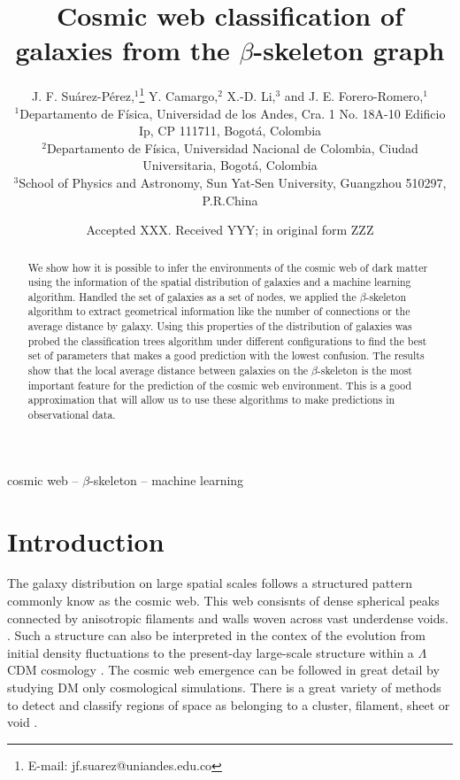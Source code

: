 \documentclass[usenatbib]{mnras}
\title[The $\beta$-skeleton and the T-web]{Cosmic web classification of galaxies from the $\beta$-skeleton graph}
\author[J. F. Su\'arez-P\'erez et al.]{
J. F. Su\'arez-P\'erez,$^{1}$\thanks{E-mail: jf.suarez@uniandes.edu.co}
Y. Camargo,$^{2}$ 
X.-D. Li,$^{3}$
and J. E. Forero-Romero,$^{1}$
\\
$^{1}$Departamento de F\'isica, Universidad de los Andes, Cra. 1 No. 18A-10 Edificio Ip, CP 111711, Bogot\'a, Colombia\\
$^{2}$Departamento de F\'isica, Universidad Nacional de Colombia, Ciudad Universitaria, Bogot\'a, Colombia\\
$^{3}$School of Physics and Astronomy, Sun Yat-Sen University, Guangzhou 510297, P.R.China\\
}
\date{Accepted XXX. Received YYY; in original form ZZZ}
\begin{document}
\label{firstpage}
\pagerange{\pageref{firstpage}--\pageref{lastpage}}
\maketitle

\begin{abstract}
We show how it is possible to infer the environments of the cosmic web
of dark matter using the information of the spatial distribution of
galaxies and a machine learning algorithm. 
Handled the set of galaxies
as a set of nodes, we applied the $\beta$-skeleton algorithm to
extract geometrical information like the number of connections or the
average distance by galaxy. 
Using this properties of the distribution
of galaxies was probed the classification trees algorithm under
different configurations to find the best set of parameters that makes
a good prediction with the lowest confusion. 
The results show that the
local average distance between galaxies on the $\beta$-skeleton is the
most important feature for the prediction of the cosmic web
environment. 
This is a good approximation that will allow us to use
these algorithms to make predictions in observational data. 
\end{abstract}

\begin{keywords}
cosmic web -- $\beta$-skeleton -- machine learning
\end{keywords}


\section{Introduction}

The galaxy distribution on large spatial scales follows a structured 
pattern commonly know as the cosmic web. 
This web consisnts of dense spherical peaks connected by
anisotropic filaments and walls woven across vast underdense voids. 
\citep{1996Bond}. 
Such a structure can also be interpreted in the contex of 
the evolution from initial density fluctuations to the present-day 
large-scale structure within a $\Lambda$CDM cosmology \citep{1987White}. 
The cosmic web emergence can be followed in great detail by studying DM only
cosmological simulations.
There is a great variety of methods to detect and classify regions of
space as belonging to a cluster, filament, sheet or void
\citep{2018Libeskind}. 
\end{document}
